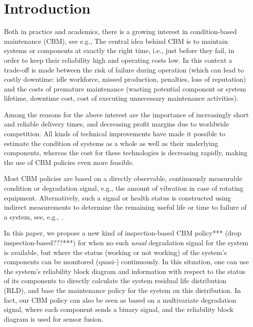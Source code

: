 \documentclass[authoryear]{elsarticle}
\begin{document}

\section{Introduction}
\label{intro}

Both in practice and academics,
there is a growing interest in condition-based maintenance (CBM), see e.g.,
\citet{2017:oldekeizer}
The central idea behind CBM is to maintain systems or components at exactly the right time,
i.e., just before they fail, %
in order to keep their reliability high and operating costs low.
In this context a trade-off is made between the risk of failure during operation
(which can lead to costly downtime: idle workforce, missed production, penalties, loss of reputation)
and the costs of premature maintenance (wasting potential component or system lifetime,
downtime cost, cost of executing unnecessary maintenance activities).

Among the reasons for the above interest are the importance of increasingly short and
reliable delivery times, and decreasing profit margins due to worldwide competition.
All kinds of technical improvements have made it possible %
to estimate the condition of systems as a whole as well as their underlying components,
whereas the cost for these technologies is decreasing rapidly,
making the use of CBM policies even more feasible.

Most CBM policies are based on a directly observable, continuously measurable condition or degradation signal,
e.g., the amount of vibration in case of rotating equipment.
Alternatively, such a signal or health status is constructed
using indirect measurements to determine the remaining useful life or time to failure of a system,
see, e.g., \citet{2014:rul-review, 2011:rul-review-statistical}.

In this paper, we propose a new kind of inspection-based CBM policy*** (drop inspection-based???***)
for when no such \emph{usual} degradation signal for the system is available,
but where the status (working or not working) of the system's components can be monitored (quasi-) continuously.
In this situation, one can use the system's reliability block diagram
and information with respect to the status of its components
to directly calculate the system residual life distribution (RLD),
and base the maintenance policy for the system on this distribution.
In fact, our CBM policy can also be seen as based on a multivariate degradation signal,
where each component sends a binary signal, and the reliability block diagram is used for sensor fusion.
\end{document}
